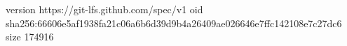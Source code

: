 version https://git-lfs.github.com/spec/v1
oid sha256:66606e5af1938fa21c06a6b6d39d9b4a26409ae026646e7ffc142108e7c27dc6
size 174916
